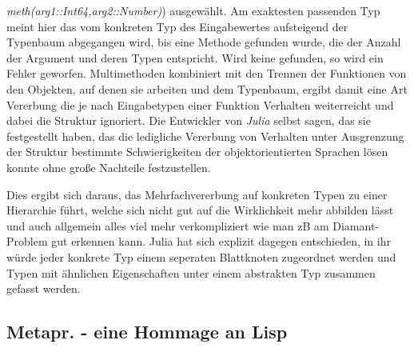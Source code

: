 \documentclass[proseminar,german,utf8]{zihpub}
\begin{document}
\textit{meth(arg1::Int64,arg2::Number)}) ausgewählt. Am exaktesten passenden Typ meint hier das vom konkreten Typ des Eingabewertes aufsteigend der Typenbaum abgegangen wird, bis eine Methode gefunden wurde, die der Anzahl der Argument und deren Typen entspricht. Wird keine gefunden, so wird ein Fehler geworfen. Multimethoden kombiniert mit den Trennen der Funktionen von den Objekten, auf denen sie arbeiten und dem Typenbaum, ergibt damit eine Art Vererbung die je nach Eingabetypen einer Funktion Verhalten weiterreicht und dabei die Struktur ignoriert. Die Entwickler von \textit{Julia} selbst sagen, das sie festgestellt haben, das die ledigliche Vererbung von Verhalten unter Ausgrenzung der Struktur bestimmte Schwierigkeiten der objektorientierten Sprachen lösen konnte ohne große Nachteile festzustellen. 

Dies ergibt sich daraus, das Mehrfachvererbung auf konkreten Typen zu einer Hierarchie führt, welche sich nicht gut auf die Wirklichkeit mehr abbilden lässt und auch allgemein alles viel mehr verkompliziert wie man zB am Diamant-Problem gut erkennen kann. Julia hat sich explizit dagegen entschieden, in ihr würde jeder konkrete Typ einem seperaten Blattknoten zugeordnet werden und Typen mit ähnlichen Eigenschaften unter einem abstrakten Typ zusammen gefasst werden.

\subsection{Metapr. - eine Hommage an Lisp}
\end{document}
